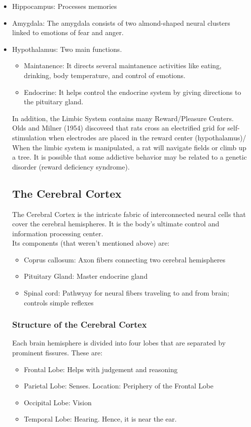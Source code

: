 \begin{itemize}
    \item Hippocampus: Processes memories
    \item Amygdala: The amygdala consists of two almond-shaped neural clusters linked to emotions of fear and anger.
    \item Hypothalamus: Two main functions.
    \begin{itemize}
        \item  Maintanence: It directs several maintanence activities like eating, drinking, body temperature, and control of emotions. 
         \item  Endocrine: It helps control the endocrine system by giving directions to the pituitary gland.
    \end{itemize}
In addition, the Limbic System contains many Reward/Pleasure Centers. Olds and Milner (1954) discoveed that rats cross an electrified grid for self-stimulation when electrodes are placed in the reward center (hypothalamus)/ When the limbic system is manipulated, a rat will navigate fields or climb up a tree. It is possible that some addictive behavior may be related to a genetic disorder (reward deficiency syndrome).

\subsection{The Cerebral Cortex}
The Cerebral Cortex is the intricate fabric of interconnected neural cells that cover the cerebral hemispheres. It is the body's ultimate control and information processing center. 
\\Its components (that weren't mentioned above) are:
\begin{itemize}
    \item Coprus callosum: Axon fibers connecting two cerebral hemispheres
    \item Pituitary Gland: Master endocrine gland
    \item Spinal cord: Pathwyay for neural fibers traveling to and from brain; controls simple reflexes
    
\end{itemize}
    
\subsubsection{Structure of the Cerebral Cortex}
Each brain hemisphere is divided into four lobes that are separated by prominent fissures. These are:
\begin{itemize}
    \item Frontal Lobe: Helps with judgement and reasoning
    \item Parietal Lobe: Senses. Location: Periphery of the Frontal Lobe
    \item Occipital Lobe: Vision
    \item Temporal Lobe: Hearing. Hence, it is near the ear.
\end{itemize}

\end{itemize}
